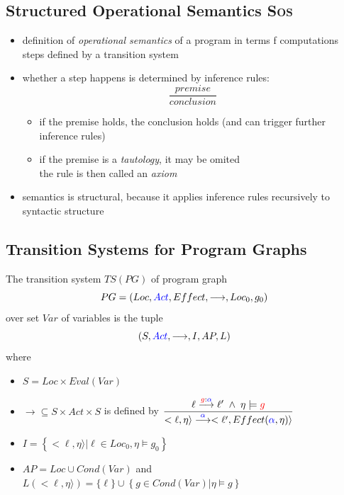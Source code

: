 \documentclass[a4paper, 10pt]{article}
\begin{document}
\subsection*{Structured Operational Semantics \textsc{Sos}}
\begin{itemize}
    \item definition of \emph{operational semantics} of a program in terms f computations steps defined by a transition system
    \item whether a step happens is determined by inference rules: \[ \frac{premise}{conclusion} \]
    \begin{itemize}
        \item if the premise holds, the conclusion holds (and can trigger further inference rules)
        \item if the premise is a \emph{tautology}, it may be omited\\
        the rule is then called an \emph{axiom}
    \end{itemize}
    \item semantics is structural, because it applies inference rules recursively to syntactic structure
\end{itemize}

\subsection*{Transition Systems for Program Graphs}
\begin{shaded}
    The transition system $TS(PG)$ of program graph \[PG=(Loc, \textcolor{blue}{Act}, Effect,\longrightarrow, Loc_0,g_0)\] over set $Var$ of variables is the tuple \[ (S,\textcolor{blue}{Act},\longrightarrow,I,AP,L) \] where
    \begin{itemize}
        \item $S=Loc\times Eval(Var)$
        \item $\longrightarrow\subseteq S\times Act\times S$ is defined by $\displaystyle\frac{\ell\overset{\textcolor{red}{g}:\textcolor{blue}{\alpha}}{\longrightarrow} \ell'\; \wedge \; \eta\models \textcolor{red}{g}}{<\ell,\eta\rangle\overset{\textcolor{blue}{\alpha}}{\longrightarrow}<\ell',Effect(\textcolor{blue}{\alpha},\eta)\rangle}$
        \item $I=\left\{<\ell,\eta\rangle | \ell \in Loc_0,\eta \models g_0\right\}$
        \item $AP=Loc \cup Cond(Var)$ and $L\left(<\ell,\eta\rangle\right)=\{\ell\} \cup \left\{ g\in Cond(Var) | \eta \models g \right\} $
    \end{itemize}
\end{shaded}
\end{document}
